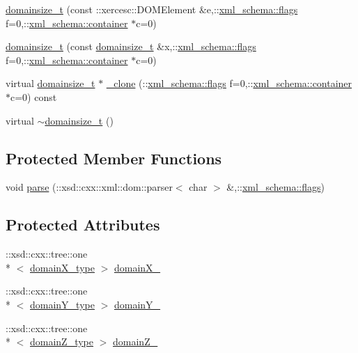 \begin{DoxyCompactItemize}
\item 
\hyperlink{classdomainsize__t_a1e6ae397612df63c580bc53bcd3f3f5b}{domainsize\-\_\-t} (const \-::xercesc\-::\-D\-O\-M\-Element \&e,\-::\hyperlink{namespacexml__schema_a0612287d030cb2732d31a45b258fdc87}{xml\-\_\-schema\-::flags} f=0,\-::\hyperlink{namespacexml__schema_ada9aa30dc722e93ee2ed7243085402a5}{xml\-\_\-schema\-::container} $\ast$c=0)
\item 
\hyperlink{classdomainsize__t_a89b0505c418287452627be4c17ae8438}{domainsize\-\_\-t} (const \hyperlink{classdomainsize__t}{domainsize\-\_\-t} \&x,\-::\hyperlink{namespacexml__schema_a0612287d030cb2732d31a45b258fdc87}{xml\-\_\-schema\-::flags} f=0,\-::\hyperlink{namespacexml__schema_ada9aa30dc722e93ee2ed7243085402a5}{xml\-\_\-schema\-::container} $\ast$c=0)
\item 
virtual \hyperlink{classdomainsize__t}{domainsize\-\_\-t} $\ast$ \hyperlink{classdomainsize__t_a917b20a45a8bc06b9663072c6c8a51e2}{\-\_\-clone} (\-::\hyperlink{namespacexml__schema_a0612287d030cb2732d31a45b258fdc87}{xml\-\_\-schema\-::flags} f=0,\-::\hyperlink{namespacexml__schema_ada9aa30dc722e93ee2ed7243085402a5}{xml\-\_\-schema\-::container} $\ast$c=0) const 
\item 
virtual \hyperlink{classdomainsize__t_a46a1c740a031fa2ad8d79d04a7cec4a8}{$\sim$domainsize\-\_\-t} ()
\end{DoxyCompactItemize}
\subsection*{Protected Member Functions}
\begin{DoxyCompactItemize}
\item 
void \hyperlink{classdomainsize__t_ae6d10ef7bc37fcd486f892ee188f561c}{parse} (\-::xsd\-::cxx\-::xml\-::dom\-::parser$<$ char $>$ \&,\-::\hyperlink{namespacexml__schema_a0612287d030cb2732d31a45b258fdc87}{xml\-\_\-schema\-::flags})
\end{DoxyCompactItemize}
\subsection*{Protected Attributes}
\begin{DoxyCompactItemize}
\item 
\-::xsd\-::cxx\-::tree\-::one\\*
$<$ \hyperlink{classdomainsize__t_a854a03c90869763fcf75511fadb5caef}{domain\-X\-\_\-type} $>$ \hyperlink{classdomainsize__t_ae05d2759ef53f4cd9ae6ee28947c3d57}{domain\-X\-\_\-}
\item 
\-::xsd\-::cxx\-::tree\-::one\\*
$<$ \hyperlink{classdomainsize__t_a668c8a71e21505b0ad029fa62f996085}{domain\-Y\-\_\-type} $>$ \hyperlink{classdomainsize__t_ad11c925754563db906c2a3a40d32edf5}{domain\-Y\-\_\-}
\item 
\-::xsd\-::cxx\-::tree\-::one\\*
$<$ \hyperlink{classdomainsize__t_ab33974c39e210e214cc02d863326cf5c}{domain\-Z\-\_\-type} $>$ \hyperlink{classdomainsize__t_ad4c2bab3295fbed5f23473cc0a560509}{domain\-Z\-\_\-}
\end{DoxyCompactItemize}



